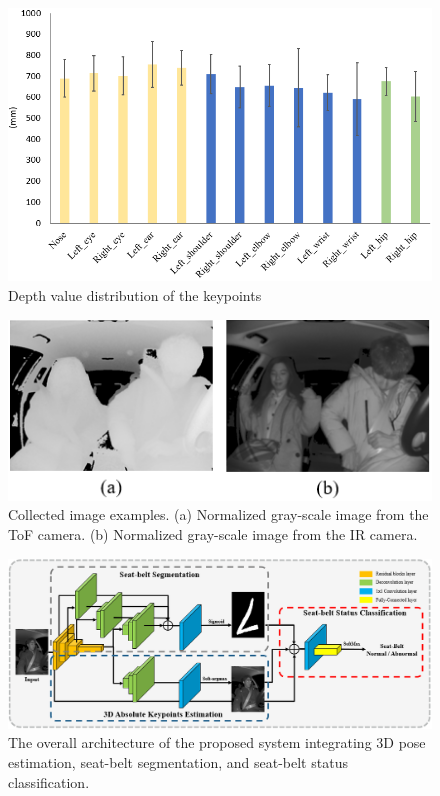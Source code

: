 \documentclass[letterpaper]{article} %
\begin{document}
\begin{figure}[t]
\centering
\includegraphics[width=\linewidth]{LaTeX/images/depth_distribution.png}
\caption{Depth value distribution of the keypoints}
\label{fig:depth_distrib}
\end{figure}

\begin{figure}[t]
\centering
\includegraphics[width=\linewidth]{LaTeX/images/input_images.png}
\caption{Collected image examples. (a) Normalized gray-scale image from the ToF camera. (b) Normalized gray-scale image from the IR camera.}
\label{fig:normaliz}
\end{figure}

\begin{figure}[t]
\centering
\includegraphics[width=\textwidth]{LaTeX/images/architecture.png}
\caption{The overall architecture of the proposed system integrating 3D pose estimation, seat-belt segmentation, and seat-belt status classification.}
\label{fig:architecture}
\end{figure}
\end{document}
